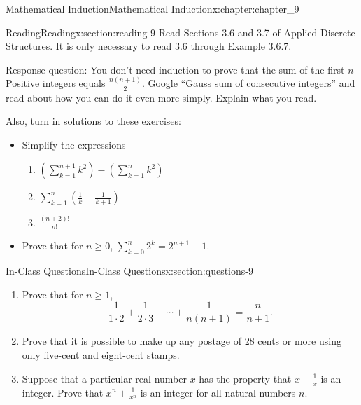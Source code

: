\documentclass[oneside,10pt,]{book}
\numberwithin{equation}{section}
\begin{document}
\begin{chapterptx}{Mathematical Induction}{}{Mathematical Induction}{}{}{x:chapter:chapter_9}
\index{}%
%
%
\typeout{************************************************}
\typeout{************************************************}
%
\begin{sectionptx}{Reading}{}{Reading}{}{}{x:section:reading-9}
Read Sections 3.6 and 3.7 of Applied Discrete Structures. It is only necessary to read 3.6 through Example 3.6.7.%
\par
Response question: You don’t need induction to prove that the sum of the first \(n\) Positive integers equals \(\frac{n(n+1)}{2}\). Google “Gauss sum of consecutive integers” and read about how you can do it even more simply. Explain what you read.%
\par
Also, turn in solutions to these exercises:%
\begin{itemize}[label=\textbullet]
\item{}Simplify the expressions%
\begin{enumerate}[label=(\alph*)]
\item{}\((\sum_{k=1}^{n+1}k^2) -(\sum_{k=1}^n k^2)\)%
\item{}\(\sum_{k=1}^n (\frac{1}{k}-\frac{1}{k+1})\)%
\item{}\(\frac{(n+2)!}{n!}\)%
\end{enumerate}
%
\item{}Prove that for \(n \ge 0\), \(\sum_{k=0}^n {2^k} = 2^{n+1}-1\).%
\end{itemize}
%
\end{sectionptx}
%
%
\typeout{************************************************}
\typeout{************************************************}
%
\begin{sectionptx}{In-Class Questions}{}{In-Class Questions}{}{}{x:section:questions-9}
%
\begin{enumerate}[label=\arabic*.]
\item{}Prove that for \(n\geq 1\),%
\begin{equation*}
\frac{1}{1\cdot 2 }+ \frac{1}{2\cdot 3}+ \cdots  + \frac{1}{n(n+1)}= \frac{n}{n+1}.
\end{equation*}
%
\item{}Prove that it is possible to make up any postage of 28 cents or more using only five-cent and eight-cent stamps.%
\item{}Suppose that a particular real number \(x\) has the property that \(x + \frac{1}{x}\) is an integer.  Prove that \(x^n + \frac{1}{x^n}\) is an integer for all natural numbers \(n\).%
\end{enumerate}
%
\end{sectionptx}
\end{chapterptx}
\end{document}
